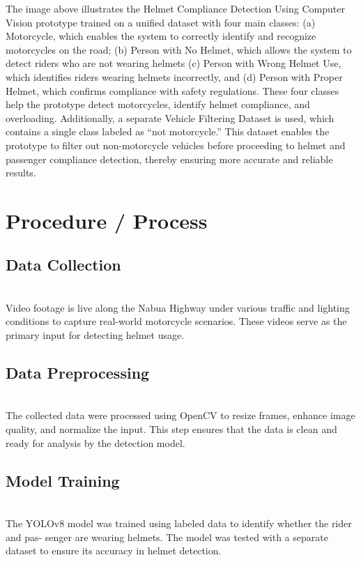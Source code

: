 \begin{refsection}
\noindent

The image above illustrates the Helmet Compliance Detection Using Computer Vision prototype trained on a unified dataset with four main classes: (a) Motorcycle, which enables the system to correctly identify and recognize motorcycles on the road; (b) Person with No Helmet, which allows the system to detect riders who are not wearing helmets (c) Person with Wrong Helmet Use, which identifies riders wearing helmets incorrectly, and (d) Person with Proper Helmet, which confirms compliance with safety regulations. These four classes help the prototype detect motorcycles, identify helmet compliance, and overloading.
Additionally, a separate Vehicle Filtering Dataset is used, which contains a single class labeled as “not motorcycle.” This dataset enables the prototype to filter out non-motorcycle vehicles before proceeding to helmet and passenger compliance detection, thereby ensuring more accurate and reliable results.



\section*{Procedure / Process}


\subsection{Data Collection} \\
Video footage is live along the Nabua Highway under various traffic and lighting conditions to capture real-world motorcycle scenarios. These videos serve as the primary input for detecting helmet usage.


\subsection {Data Preprocessing} \\
The collected data were processed using OpenCV to resize frames, enhance image quality, and normalize the input. This step ensures that the data is clean and ready for analysis by the detection model.


\subsection {Model Training} \\
The YOLOv8 model was trained using labeled data to identify whether the rider and pas- senger are wearing helmets. The model was tested with a separate dataset to ensure its accuracy in helmet detection.


\end{refsection}

